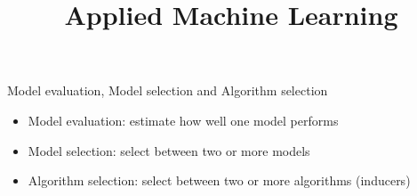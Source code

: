 \documentclass[11pt,compress,t,notes=noshow, xcolor=table]{beamer}
\title{Applied Machine Learning}
\date{}
\begin{document}


\begin{frame}{Model evaluation, Model selection and Algorithm selection}
\vfill
\begin{itemize}
    \item Model evaluation: estimate how well one model performs
    \item Model selection: select between two or more models
    \item Algorithm selection: select between two or more algorithms (inducers)
\end{itemize}
\vfill
\end{frame}


\end{document}
